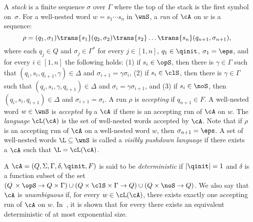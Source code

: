 A \emph{stack} is a finite sequence $\sigma$ over $\Gamma$ where the top of the stack is the first symbol on~$\sigma$. For a well-nested word $w = s_1 \cdots s_n$ in $\wnS$, a \emph{run} of $\cA$ on $w$ is a sequence:
$$
\rho = (q_1,\sigma_1) \trans{s_1} (q_2,\sigma_2) \trans{s_2} \ldots \trans{s_n} (q_{n+1},\sigma_{n+1}),
$$ 
where each $q_j \in Q$ and $\sigma_j\in\Gamma^{*}$ for every $j\in[1,n]$, $q_1\in \qinit$, $\sigma_1 = \eps$, and for every $i\in[1,n]$ the following holds: 
(1) if $s_{i}\in\opS$, then there is $\gamma\in\Gamma$ such that $(q_i,s_{i},q_{i+1},\gamma) \in \Delta$ and $\sigma_{i+1} = \gamma\sigma_i$, 
(2) if $s_{i}\in\clS$, then there is $\gamma\in\Gamma$ such that $(q_i,s_{i},\gamma,q_{i+1}) \in \Delta$ and $\sigma_{i} = \gamma\sigma_{i+1}$, and
(3) if $s_{i}\in\noS$, then $(q_i,s_{i},q_{i+1}) \in \Delta$ and $\sigma_{i+1} = \sigma_i$.
A run $\rho$ is \emph{accepting} if $q_{n+1}\in F$. A well-nested word $w\in\wnS$ is \emph{accepted by} a \vpa $\cA$ if there is an accepting run of $\cA$ on $w$. The \emph{language} $\cL(\cA)$ is the set of well-nested words accepted by $\cA$. Note that if $\rho$ is an accepting run of $\cA$ on a well-nested word $w$, then $\sigma_{n+1} = \eps$. A set of well-nested words $\L \subseteq \wnS$ is called a \emph{visibly pushdown language} if there exists a \vpa $\cA$ such that $\L = \cL(\cA)$.

A \vpa $\cA = (Q, \Sigma, \Gamma, \delta, \qinit, F)$ is said to be \emph{deterministic} if $|\qinit| =1$ and $\delta$ is a function subset of the set $(Q\,\times\opS \to Q\times \Gamma) \cup
(Q\times\clS\times\Gamma \to Q)\cup
(Q\times\noS \to Q)$. We also say that $\cA$ is \emph{unambiguous} if, for every $w \in \cL(\cA)$, there exists exactly one accepting run of $\cA$ on $w$. In~\cite{AlurM04}, it is shown that for every \vpa there exists an equivalent deterministic \vpa of at most exponential size. 
